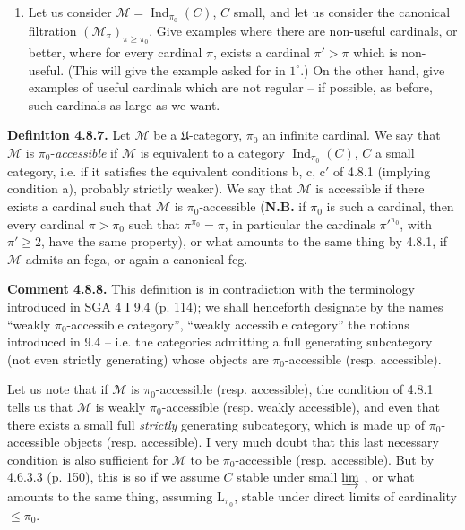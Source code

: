 \documentclass[11pt]{article}
\newcommand{\printedpage}[1]{\marginpar{\footnotesize p.~#1}}
\newcommand{\msp}[1]{\marginpar{\footnotesize [#1]}}
\newcommand{\Ind}{\operatorname{Ind}}
\begin{document}
\msp{page 205}
\begin{enumerate}
\item[4)] Let us consider $\mathcal{M}=\Ind_{\pi_0}(C)$, $C$ small, and let us consider the canonical filtration $(\mathcal{M}_\pi)_{\pi\geqslant\pi_0}$. Give examples where there are non-useful cardinals, or better, where for every cardinal $\pi$, exists a cardinal $\pi'>\pi$ which is non-useful. (This will give the example asked for in $1^\circ$.) On the other hand, give examples of useful cardinals which are not regular -- if possible, as before, such cardinals as large as we want.
\end{enumerate}

\textbf{Definition 4.8.7.} Let $\mathcal{M}$ be a $\mathfrak{U}$-category, $\pi_0$ an infinite cardinal. We say that $\mathcal{M}$ is $\pi_0$-\textit{accessible} if $\mathcal{M}$ is equivalent to a category $\Ind_{\pi_0}(C)$, $C$ a small category, i.e. if it satisfies the equivalent conditions b, c, c$'$ of 4.8.1 (implying condition a), probably strictly weaker). We say that $\mathcal{M}$ is accessible if there exists a cardinal such that $\mathcal{M}$ is $\pi_0$-accessible (\textbf{N.B.} if $\pi_0$ is such a cardinal, then every cardinal $\pi>\pi_0$ such that $\pi^{\pi_0}=\pi$, in particular the cardinals $\pi'^{\pi_0}$, with $\pi'\geqslant 2$, have the same property), or what
\msp{page 206}
amounts to the same thing by 4.8.1, if $\mathcal{M}$ admits an fcga, or again a canonical fcg.

\textbf{Comment 4.8.8.} This definition is in contradiction with the terminology introduced in SGA 4 I 9.4 (p. 114); we shall henceforth designate by the names ``weakly $\pi_0$-accessible category'', ``weakly accessible category'' the notions introduced in 9.4 -- i.e. the categories admitting a full generating subcategory (not even strictly generating) whose objects are $\pi_0$-accessible (resp. accessible).

Let us note that if $\mathcal{M}$ is $\pi_0$-accessible (resp. accessible), the condition of 4.8.1 tells us that $\mathcal{M}$ is weakly $\pi_0$-accessible (resp. weakly accessible), and even that there exists a small full \textit{strictly} generating subcategory, which is made up of $\pi_0$-accessible objects (resp. accessible). I very much doubt that this last necessary condition is also sufficient for
\printedpage{73}
$\mathcal{M}$ to be $\pi_0$-accessible (resp. accessible). But by 4.6.3.3 (p. 150), this is so if we assume $C$ stable under small $\varinjlim$ , or what amounts to the same thing, assuming $\mathrm{L}_{\pi_0}$, stable under direct limits of cardinality $\leqslant\pi_0$.
\end{document}

